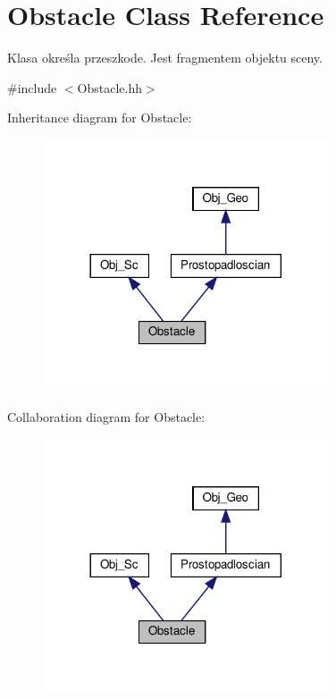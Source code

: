 \hypertarget{class_obstacle}{}\section{Obstacle Class Reference}
\label{class_obstacle}


Klasa określa przeszkode. Jest fragmentem objektu sceny.  




{\ttfamily \#include $<$Obstacle.\+hh$>$}



Inheritance diagram for Obstacle\+:
\nopagebreak
\begin{figure}[H]
\begin{center}
\leavevmode
\includegraphics[width=240pt]{class_obstacle__inherit__graph}
\end{center}
\end{figure}


Collaboration diagram for Obstacle\+:
\nopagebreak
\begin{figure}[H]
\begin{center}
\leavevmode
\includegraphics[width=240pt]{class_obstacle__coll__graph}
\end{center}
\end{figure}
